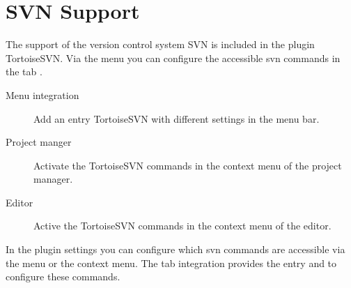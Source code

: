 \section{SVN Support}\label{sec:svn}

The support of the version control system SVN is included in the \codeblocks plugin TortoiseSVN. Via the menu  you can configure the accessible svn commands in the tab .

\begin{description}
\item[Menu integration] Add an entry TortoiseSVN with different settings in the menu bar.
\item[Project manger] Activate the TortoiseSVN commands in the context menu of the project manager.
\item[Editor] Active the TortoiseSVN commands in the context menu of the editor.
\end{description}

In the plugin settings you can configure which svn commands are accessible via the menu or the context menu. The tab integration provides the entry  and  to configure these commands.


